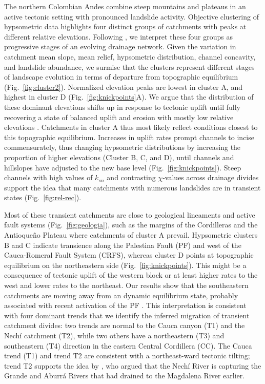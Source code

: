 \documentclass[draft]{agujournal2019}
\begin{document}
\par The northern Colombian Andes combine steep mountains and plateaus in an active tectonic setting with pronounced landslide activity. Objective clustering of hypsometric data highlights four distinct groups of catchments with peaks at different relative elevations. Following , we interpret these four groups as progressive stages of an evolving drainage network. Given the variation in catchment mean slope, mean relief, hypsometric distribution, channel concavity, and landslide abundance, we surmise that the clusters represent different stages of landscape evolution in terms of departure from topographic equilibrium (Fig.~\ref{fig:cluster2}). Normalized elevation peaks are lowest in cluster A, and highest in cluster D (Fig.~\ref{fig:knickpoints}A). We argue that the distribution of these dominant elevations shifts up in response to tectonic uplift until fully recovering a state of balanced uplift and erosion with mostly low relative elevations \cite{Gallen2011}. Catchments in cluster A thus most likely reflect conditions closest to this topographic equilibrium. Increases in uplift rates prompt channels to incise commensurately, thus changing hypsometric distributions by increasing the proportion of higher elevations (Cluster B, C, and D), until channels and hillslopes have adjusted to the new base level (Fig.~\ref{fig:knickpoints}). Steep channels with high values of $k_{sn}$ and contrasting $\chi$-values across drainage divides support the idea that many catchments with numerous landslides are in transient states (Fig.~\ref{fig:rel-rec}).

\par Most of these transient catchments are close to geological lineaments and active fault systems (Fig.~\ref{fig:geologia}), such as the margins of the Cordilleras and the Antioqueño Plateau where catchments of cluster A prevail. Hypsometric clusters B and C indicate transience along the Palestina Fault (PF) and west of the Cauca-Romeral Fault System (CRFS), whereas cluster D points at topographic equilibrium on the northeastern side (Fig.~\ref{fig:knickpoints}). This might be a consequence of tectonic uplift of the western block or at least higher rates to the west \cite{perez2021} and lower rates to the northeast. Our results show that the southeastern catchments are moving away from an dynamic equilibrium state, probably associated with recent activation of the PF \cite{acosta2007, feininger1970}. This interpretation is consistent with four dominant trends that we identify the inferred migration of transient catchment divides: two trends are normal to the Cauca canyon (T1) and the Nechí catchment (T2), while two others have a northeastern (T3) and southeastern (T4) direction in the eastern Central Cordillera (CC). The Cauca trend (T1) and trend T2 are consistent with a northeast-ward tectonic tilting; trend T2 supports the idea by , who argued that the Nechí River is capturing the Grande and Aburrá Rivers that had drained to the Magdalena River earlier. 
\end{document}
